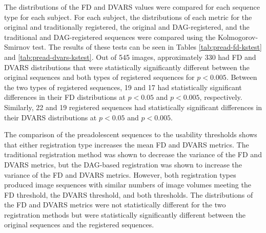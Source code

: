 The distributions of the FD and DVARS values were compared for each sequence type for each subject. For each subject, the distributions of each metric for the original and traditionally registered, the original and DAG-registered, and the traditional and DAG-registered sequences were compared using the Kolmogorov-Smirnov test. The results of these tests can be seen in Tables \ref{tab:pread-fd-kstest} and \ref{tab:pread-dvars-kstest}. Out of 545 images, approximately 330 had FD and DVARS distributions that were statistically significantly different between the original sequences and both types of registered sequences for $p < 0.005$. Between the two types of registered sequences, 19 and 17 had statistically significant differences in their FD distributions at $p < 0.05$ and $p < 0.005$, respectively. Similarly, 22 and 19 registered sequences had statistically significant differences in their DVARS distributions at $p < 0.05$ and $p < 0.005$. 

The comparison of the preadolescent sequences to the usability thresholds shows that either registration type increases the mean FD and DVARS metrics. The traditional registration method was shown to decrease the variance of the FD and DVARS metrics, but the DAG-based registration was shown to increase the variance of the FD and DVARS metrics. However, both registration types produced image sequences with similar numbers of image volumes meeting the FD threshold, the DVARS threshold, and both thresholds. The distributions of the FD and DVARS metrics were not statistically different for the two registration methods but were statistically significantly different between the original sequences and the registered sequences.





